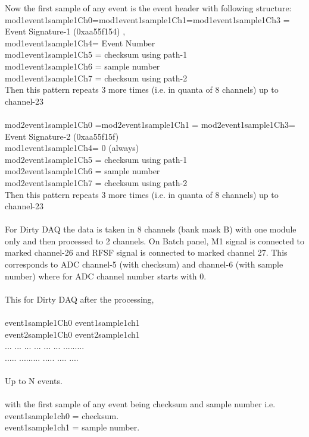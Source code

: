 \documentclass[12pt]{article}
\begin{document}
Now the first sample of any event is the event header with following structure:\\
mod1event1sample1Ch0=mod1event1sample1Ch1=mod1event1sample1Ch3 = Event Signature-1 (0xaa55f154) ,\\ mod1event1sample1Ch4= Event Number\\
mod1event1sample1Ch5 = checksum using path-1  \\mod1event1sample1Ch6 = sample number \\mod1event1sample1Ch7 = checksum using path-2 \\
Then this pattern repeats 3 more times (i.e. in quanta of 8 channels) up to channel-23\\
\\
mod2event1sample1Ch0 =mod2event1sample1Ch1 = mod2event1sample1Ch3= Event Signature-2 (0xaa55f15f) \\mod1event1sample1Ch4= 0 (always)\\
mod2event1sample1Ch5 = checksum using path-1 \\ mod2event1sample1Ch6 = sample number \\mod2event1sample1Ch7 = checksum using path-2 \\
Then this pattern repeats 3 more times (i.e. in quanta of 8 channels) up to channel-23\\
\\
For Dirty DAQ the data is taken in 8 channels (bank mask B) with one module only and then processed to 2 channels.
On Batch panel, M1 signal is connected to marked channel-26 and RFSF signal is connected to marked channel 27. This corresponds to 
ADC channel-5 (with checksum) and channel-6 (with sample number) where for ADC channel number starts with 0.\\
\\
This for Dirty DAQ after the processing,\\
\\
event1sample1Ch0   event1sample1ch1\\
event2sample1Ch0   event2sample1ch1\\
... ... ... ... ... ... .........\\
.....  .........  ..... .... ....\\
\\
Up to N events.\\
\\
with the first sample of any event being checksum and sample number i.e.\\
     event1sample1ch0 = checksum.\\
     event1sample1ch1 = sample number.\\
\end{document}
